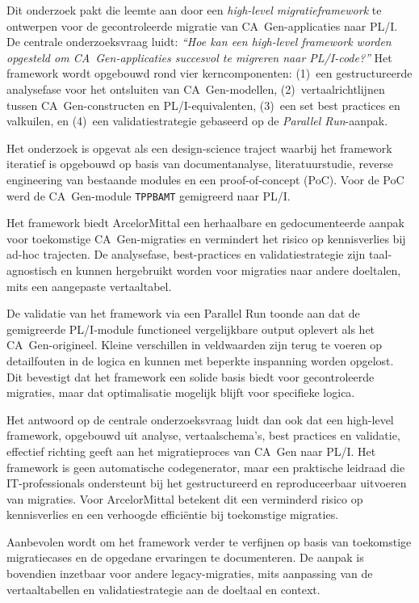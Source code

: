 Dit onderzoek pakt die leemte aan door een \emph{high-level migratieframework} te ontwerpen voor de
gecontroleerde migratie van CA~Gen-applicaties naar PL/I. De centrale onderzoeksvraag luidt: \textit{``Hoe
kan een high-level framework worden opgesteld om CA~Gen-applicaties succesvol te migreren naar
PL/I-code?''} Het framework wordt opgebouwd rond vier kerncomponenten: (1)~een gestructureerde
analysefase voor het ontsluiten van CA~Gen-modellen, (2)~vertaalrichtlijnen tussen
CA~Gen-constructen en PL/I-equivalenten, (3)~een set best practices en valkuilen, en (4)~een
validatiestrategie gebaseerd op de \emph{Parallel Run}-aanpak.

Het onderzoek is opgevat als een design-science traject waarbij het framework iteratief is opgebouwd op
basis van documentanalyse, literatuurstudie, reverse engineering van bestaande modules en een
proof-of-concept (PoC). Voor de PoC werd de CA~Gen-module \texttt{TPPBAMT} gemigreerd naar PL/I. 

Het framework biedt ArcelorMittal een herhaalbare en
gedocumenteerde aanpak voor toekomstige CA~Gen-migraties en vermindert het risico op kennisverlies bij
ad-hoc trajecten. De analysefase, best-practices en validatiestrategie zijn taal-agnostisch en kunnen
hergebruikt worden voor migraties naar andere doeltalen, mits een aangepaste vertaaltabel.

De validatie van het framework via een Parallel Run toonde aan dat de gemigreerde PL/I-module functioneel vergelijkbare output oplevert als het CA~Gen-origineel. Kleine verschillen in veldwaarden zijn terug te voeren op detailfouten in de logica en kunnen met beperkte inspanning worden opgelost. Dit bevestigt dat het framework een solide basis biedt voor gecontroleerde migraties, maar dat optimalisatie mogelijk blijft voor specifieke logica.

Het antwoord op de centrale onderzoeksvraag luidt dan ook dat een high-level framework, opgebouwd uit analyse, vertaalschema's, best practices en validatie, effectief richting geeft aan het migratieproces van CA~Gen naar PL/I. Het framework is geen automatische codegenerator, maar een praktische leidraad die IT-professionals ondersteunt bij het gestructureerd en reproduceerbaar uitvoeren van migraties. Voor ArcelorMittal betekent dit een verminderd risico op kennisverlies en een verhoogde efficiëntie bij toekomstige migraties.

Aanbevolen wordt om het framework verder te verfijnen op basis van toekomstige migratiecases en de opgedane ervaringen te documenteren. De aanpak is bovendien inzetbaar voor andere legacy-migraties, mits aanpassing van de vertaaltabellen en validatiestrategie aan de doeltaal en context.
